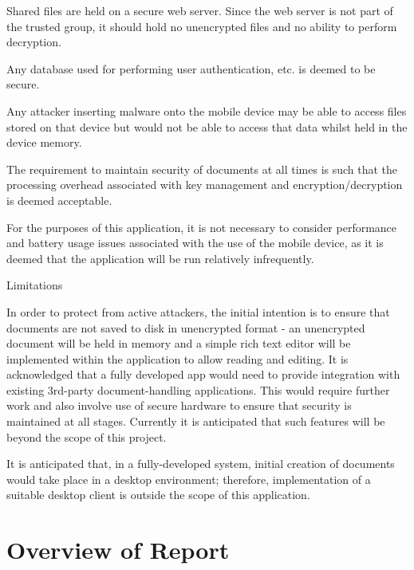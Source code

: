 Shared files are held on a secure web server. Since the web server is not part of the trusted group, it should hold no unencrypted files and no ability to perform decryption.

Any database used for performing user authentication, etc. is deemed to be secure.

Any attacker inserting malware onto the mobile device may be able to access files stored on that device but would not be able to access that data whilst held in the device memory.

The requirement to maintain security of documents at all times is such that the processing overhead associated with key management and encryption/decryption is deemed acceptable.

For the purposes of this application, it is not necessary to consider performance and battery usage issues associated with the use of the mobile device, as it is deemed that the application will be run relatively infrequently.

Limitations

In order to protect from active attackers, the initial intention is to ensure that documents are not saved to disk in unencrypted format - an unencrypted document will be held in memory and a simple rich text editor will be implemented within the application to allow reading and editing. It is acknowledged that a fully developed app would need to provide integration with existing 3rd-party document-handling applications. This would require further work and also involve use of secure hardware to ensure that security is maintained at all stages. Currently it is anticipated that such features will be beyond the scope of this project.

It is anticipated that, in a fully-developed system, initial creation of documents would take place in a desktop environment; therefore, implementation of a suitable desktop client is outside the scope of this application.

\section{Overview of Report}
\label{sec:overview}